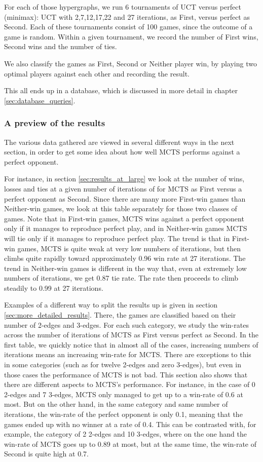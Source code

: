 For each of those hypergraphs, we run 6 tournaments of UCT versus perfect (minimax): UCT with 2,7,12,17,22 and 27 iterations, as First, versus perfect as Second.
Each of these tournaments consist of 100 games, since the outcome of a game is random. Within a given tournament, we record the number of First wins, Second wins and the number of ties.

We also classify the games as First, Second or Neither player win, by playing two optimal players against each other and recording the result.

This all ends up in a database, which is discussed in more detail in chapter \ref{sec:database_queries}.

\subsubsection{A preview of the results}

The various data gathered are viewed in several different ways in the next section, in order to get some idea about how well MCTS performs against a perfect opponent.

For instance, in section \ref{sec:results_at_large} we look at the number of wins, losses and ties at a given number of iterations of for MCTS as First versus a perfect opponent as Second. Since there are many more First-win games than Neither-win games, we look at this table separately for those two classes of games. Note that in First-win games, MCTS wins against a perfect opponent only if it manages to reproduce perfect play, and in Neither-win games MCTS will tie only if it manages to reproduce perfect play. The trend is that in First-win games, MCTS is quite weak at very low numbers of iterations, but then climbs quite rapidly toward approximately 0.96 win rate at 27 iterations. The trend in Neither-win games is different in the way that, even at extremely low numbers of iterations, we get 0.87 tie rate. The rate then proceeds to climb steadily to 0.99 at 27 iterations.

Examples of a different way to split the results up is given in section \ref{sec:more_detailed_results}.
There, the games are classified based on their number of 2-edges and 3-edges. For each such category, we study the win-rates across the number of iterations of MCTS as First versus perfect as Second.
In the first table, we quickly notice that in almost all of the cases, increasing numbers of iterations means an increasing win-rate for MCTS. There are exceptions to this in some categories (such as for twelve 2-edges and zero 3-edges), but even in those cases the performance of MCTS is not bad.
This section also shows that there are different aspects to MCTS's performance. For instance, in the case of 0 2-edges and 7 3-edges, MCTS only managed to get up to a win-rate of 0.6 at most. But on the other hand, in the same category and same number of iterations, the win-rate of the perfect opponent is only 0.1, meaning that the games ended up with no winner at a rate of 0.4. This can be contrasted with, for example, the category of 2 2-edges and 10 3-edges, where on the one hand the win-rate of MCTS goes up to 0.89 at most, but at the same time, the win-rate of Second is quite high at 0.7.
